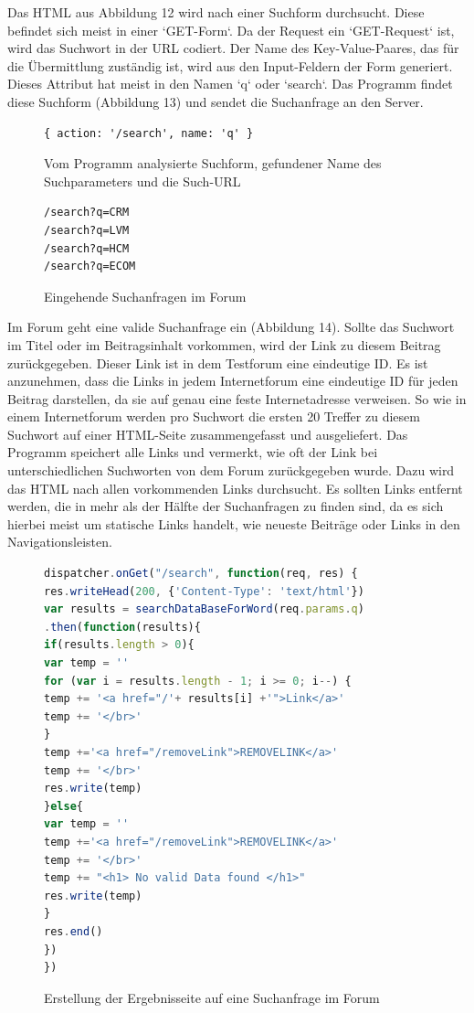 Das HTML aus Abbildung 12 wird nach einer Suchform durchsucht. Diese befindet sich meist in einer `GET-Form`. Da der Request ein `GET-Request` ist, wird das Suchwort in der URL codiert. Der Name des Key-Value-Paares, das für die Übermittlung zuständig ist, wird aus den Input-Feldern der Form generiert. Dieses Attribut hat meist in den Namen `q` oder `search`. Das Programm findet diese Suchform (Abbildung 13) und sendet die Suchanfrage an den Server.


\begin{figure}[ht]
\begin{lstlisting}[language=HTML5]
{ action: '/search', name: 'q' }
\end{lstlisting}
\caption{Vom Programm analysierte Suchform, gefundener Name des Suchparameters und die Such-URL}
\end{figure}


\begin{figure}[ht]
\begin{lstlisting}[language=HTML5]
/search?q=CRM
/search?q=LVM
/search?q=HCM
/search?q=ECOM
\end{lstlisting}
\caption{Eingehende Suchanfragen im Forum }
\end{figure}
Im Forum geht eine valide Suchanfrage ein (Abbildung 14).
Sollte das Suchwort im Titel oder im Beitragsinhalt vorkommen, wird der Link zu diesem Beitrag zurückgegeben. Dieser Link ist in dem Testforum eine eindeutige ID. Es ist anzunehmen, dass die Links in jedem Internetforum eine eindeutige ID für jeden Beitrag darstellen, da sie auf genau eine feste Internetadresse verweisen. So wie in einem Internetforum werden pro Suchwort die ersten 20 Treffer zu diesem Suchwort auf einer HTML-Seite zusammengefasst und ausgeliefert. Das Programm speichert alle Links und vermerkt, wie oft der Link bei unterschiedlichen Suchworten von dem Forum zurückgegeben wurde. Dazu wird das HTML nach allen vorkommenden Links durchsucht. Es sollten Links entfernt werden, die in mehr als der Hälfte der Suchanfragen zu finden sind, da es sich hierbei meist um statische Links handelt, wie neueste Beiträge oder Links in den Navigationsleisten.
\newpage

\begin{figure}[h!]
\begin{lstlisting}[language=JavaScript]
dispatcher.onGet("/search", function(req, res) {
res.writeHead(200, {'Content-Type': 'text/html'})
var results = searchDataBaseForWord(req.params.q)
.then(function(results){
if(results.length > 0){
var temp = ''
for (var i = results.length - 1; i >= 0; i--) {
temp += '<a href="/'+ results[i] +'">Link</a>'
temp += '</br>'
}
temp +='<a href="/removeLink">REMOVELINK</a>'
temp += '</br>'
res.write(temp)
}else{
var temp = ''
temp +='<a href="/removeLink">REMOVELINK</a>'
temp += '</br>'
temp += "<h1> No valid Data found </h1>"
res.write(temp)
}
res.end() 
}) 
})
\end{lstlisting}
\caption{Erstellung der Ergebnisseite auf eine Suchanfrage im Forum}
\end{figure}

